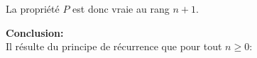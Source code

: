 \documentclass[a4paper, 11pt,reqno]{article}
\begin{document}
\begin{correction}
\begin{enumerate}
La propriété $P$ est donc vraie au rang $n+1$.

\textbf{Conclusion:}\\
Il r\'esulte du principe de r\'ecurrence que pour tout $ n\geq 0$:
\begin{center}
\end{center}





\end{enumerate}
\end{correction}
\end{document}
